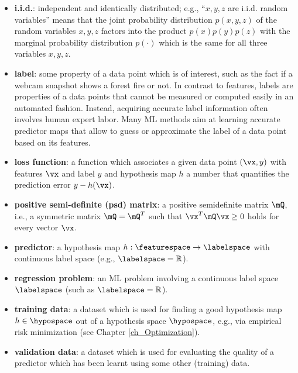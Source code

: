 \documentclass[12pt]{report}
\begin{document}
\begin{itemize}
\item {\bf i.i.d.}: independent and identically distributed; e.g., ``$x,y,z$ are i.i.d. random variables'' 
means that the joint probability distribution $p(x,y,z)$ of the random variables $x,y,z$ factors into 
the product $p(x)p(y)p(z)$ with the marginal probability distribution $p(\cdot)$ which is the same 
for all three variables $x,y,z$. 

\item {\bf label}: some property of a data point which is of interest, such as the fact if a webcam 
snapshot shows a forest fire or not. In contrast to features, labels are properties of a data points 
that cannot be measured or computed easily in an automated fashion. Instead, acquiring accurate 
label information often involves human expert labor. Many ML methods aim at learning accurate 
predictor maps that allow to guess or approximate the label of a data point based on its features. 

\item {\bf loss function}: a function which associates a given data point $(\vx,y)$ with features $\vx$ 
and label $y$ and hypothesis map $h$ a number that quantifies the prediction error $y-h(\vx)$. 

\item {\bf positive semi-definite (psd) matrix}: a positive semidefinite matrix $\mQ$, i.e., a symmetric 
matrix $\mQ = \mQ^{T}$ such that $\vx^{T} \mQ \vx \geq 0$ holds for every vector $\vx$. 

\item {\bf predictor}: a hypothesis map $h: \featurespace \rightarrow \labelspace$ with continuous 
label space (e.g., $\labelspace = \mathbb{R}$). 

\item {\bf regression problem}: an ML problem involving a continuous label space $\labelspace$ 
(such as $\labelspace = \mathbb{R}$). 

\item {\bf training data}: a dataset which is used for finding a good hypothesis map $h \in \hypospace$ 
out of a hypothesis space $\hypospace$, e.g., via empirical risk minimization (see Chapter \ref{ch_Optimization}). 

\item {\bf validation data}: a dataset which is used for evaluating the quality of a predictor which 
has been learnt using some other (training) data. 
\end{itemize} 
                                    









%

\end{document}
